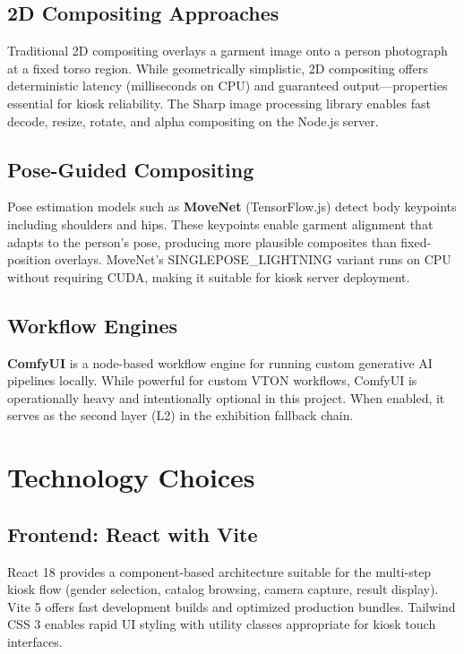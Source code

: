 \subsection{2D Compositing Approaches}

Traditional 2D compositing overlays a garment image onto a person photograph at a fixed torso region. While geometrically simplistic, 2D compositing offers deterministic latency (milliseconds on CPU) and guaranteed output---properties essential for kiosk reliability. The Sharp image processing library enables fast decode, resize, rotate, and alpha compositing on the Node.js server.

\subsection{Pose-Guided Compositing}

Pose estimation models such as \textbf{MoveNet} (TensorFlow.js) detect body keypoints including shoulders and hips. These keypoints enable garment alignment that adapts to the person's pose, producing more plausible composites than fixed-position overlays. MoveNet's SINGLEPOSE\_LIGHTNING variant runs on CPU without requiring CUDA, making it suitable for kiosk server deployment.

\subsection{Workflow Engines}

\textbf{ComfyUI} is a node-based workflow engine for running custom generative AI pipelines locally. While powerful for custom VTON workflows, ComfyUI is operationally heavy and intentionally optional in this project. When enabled, it serves as the second layer (L2) in the exhibition fallback chain.

\section{Technology Choices}
\label{sec:technology-choices}

\subsection{Frontend: React with Vite}

React 18 provides a component-based architecture suitable for the multi-step kiosk flow (gender selection, catalog browsing, camera capture, result display). Vite 5 offers fast development builds and optimized production bundles. Tailwind CSS 3 enables rapid UI styling with utility classes appropriate for kiosk touch interfaces.

